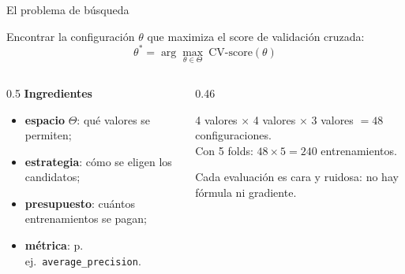 \documentclass[aspectratio=169,12pt]{beamer}
\newcommand{\colhead}[1]{\textbf{#1}\par\vspace{2pt}}
\begin{document}
\begin{frame}{El problema de búsqueda}
  \begin{center}
    Encontrar la configuración $\theta$ que maximiza el score de validación cruzada:
    \[ \theta^* = \arg\max_{\theta \in \Theta} \ \text{CV-score}(\theta) \]
  \end{center}
  \begin{columns}[T]
    \begin{column}{0.5\textwidth}
      \colhead{Ingredientes}
      \small
      \begin{itemize}
        \item \textbf{espacio} $\Theta$: qué valores se permiten;
        \item \textbf{estrategia}: cómo se eligen los candidatos;
        \item \textbf{presupuesto}: cuántos entrenamientos se pagan;
        \item \textbf{métrica}: p.\,ej.\ \texttt{average\_precision}.
      \end{itemize}
    \end{column}
    \begin{column}{0.46\textwidth}
      \begin{rulebox}
        \small 4 valores $\times$ 4 valores $\times$ 3 valores $= 48$ configuraciones.\\
        Con 5 folds: $48 \times 5 = 240$ entrenamientos.
      \end{rulebox}
      \footnotesize Cada evaluación es cara y ruidosa: no hay fórmula ni gradiente.
    \end{column}
  \end{columns}
\end{frame}
\end{document}
